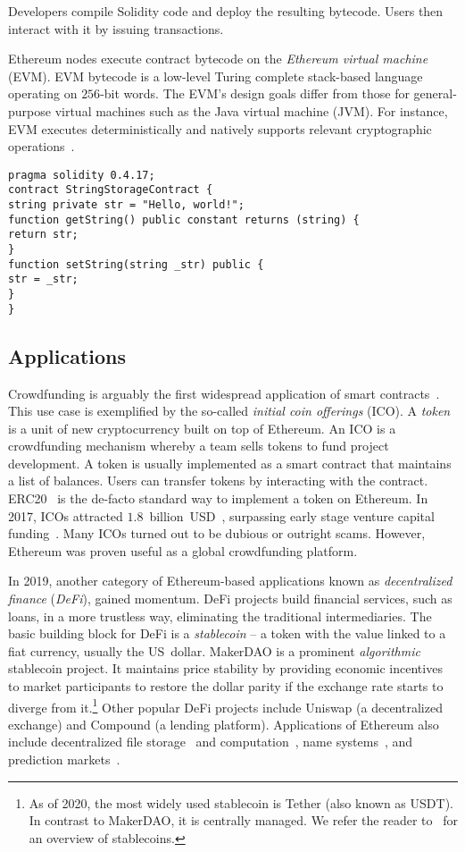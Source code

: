 Developers compile Solidity code and deploy the resulting bytecode.
Users then interact with it by issuing transactions.

Ethereum nodes execute contract bytecode on the \textit{Ethereum virtual machine} (EVM).
EVM bytecode is a low-level Turing complete stack-based language operating on $256$-bit words.
The EVM's design goals differ from those for general-purpose virtual machines such as the Java virtual machine (JVM).
For instance, EVM executes deterministically and natively supports relevant cryptographic operations~\cite{Buterin2017}.

\begin{lstlisting}[language=Solidity, label={lst:SolidityExample}, caption=A simple contract in Solidity]
pragma solidity 0.4.17;
contract StringStorageContract {
string private str = "Hello, world!";
function getString() public constant returns (string) {
return str;
}
function setString(string _str) public {
str = _str;
}
}
\end{lstlisting}


\subsection{Applications}

Crowdfunding is arguably the first widespread application of smart contracts~\cite{McAdams2017}.
This use case is exemplified by the so-called \textit{initial coin offerings} (ICO).
A \textit{token} is a unit of new cryptocurrency built on top of Ethereum.
An ICO is a crowdfunding mechanism whereby a team sells tokens to fund project development. 
A token is usually implemented as a smart contract that maintains a list of balances.
Users can transfer tokens by interacting with the contract.
ERC20~\cite{Victor2019} is the de-facto standard way to implement a token on Ethereum.
In 2017, ICOs attracted $1.8$~billion~USD~\cite{CoindeakICOTracker}, surpassing early stage venture capital funding~\cite{Sunnarborg2017}.
Many ICOs turned out to be dubious or outright scams.
However, Ethereum was proven useful as a global crowdfunding platform.

In 2019, another category of Ethereum-based applications known as \textit{decentralized finance} (\textit{DeFi}), gained momentum.
DeFi projects build financial services, such as loans, in a more trustless way, eliminating the traditional intermediaries.
The basic building block for DeFi is a \textit{stablecoin} -- a token with the value linked to a fiat currency, usually the US~dollar.
MakerDAO is a prominent \textit{algorithmic} stablecoin project.
It maintains price stability by providing economic incentives to market participants to restore the dollar parity if the exchange rate starts to diverge from it.\footnote{As of 2020, the most widely used stablecoin is Tether (also known as USDT). In contrast to MakerDAO, it is centrally managed. We refer the reader to~\cite{Clark2020,KlagesMundt2020} for an overview of stablecoins.}
Other popular DeFi projects include Uniswap (a decentralized exchange) and Compound (a lending platform).
Applications of Ethereum also include decentralized file storage~\cite{Storj} and computation~\cite{Golem}, name systems~\cite{ENS}, and prediction markets~\cite{Augur, Gnosis}.


